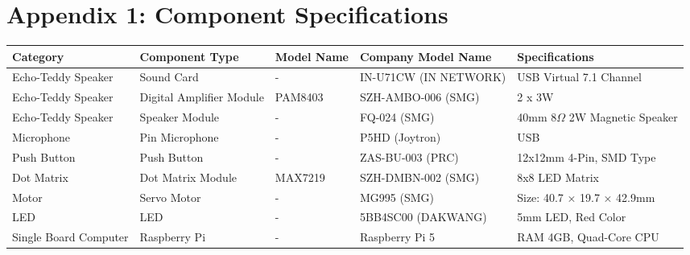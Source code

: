 
\newpage

\section{Appendix 1: Component Specifications}
\label{appendix}

\renewcommand{\arraystretch}{1.2}
\begin{table}[hbt!]
    \centering
    \scriptsize
    \renewcommand{\arraystretch}{1.2} %
    \setlength{\extrarowheight}{1pt}  %
    \begin{tabularx}{\textwidth}{XXXXX} %
        \hline
        \textbf{Category} & \textbf{Component Type} & \textbf{Model Name} & \textbf{Company Model Name} & \textbf{Specifications} \\
        \hline
        Echo-Teddy Speaker & Sound Card & - & IN-U71CW (IN NETWORK) & USB Virtual 7.1 Channel \\
        Echo-Teddy Speaker & Digital Amplifier Module & PAM8403 & SZH-AMBO-006 (SMG) & 2 x 3W \\
        Echo-Teddy Speaker & Speaker Module & - & FQ-024 (SMG) & 40mm 8$\Omega$ 2W Magnetic Speaker \\
        Microphone & Pin Microphone & - & P5HD (Joytron) & USB \\
        Push Button & Push Button & - & ZAS-BU-003 (PRC) & 12x12mm 4-Pin, SMD Type \\
        Dot Matrix & Dot Matrix Module & MAX7219 & SZH-DMBN-002 (SMG) & 8x8 LED Matrix \\
        Motor & Servo Motor & - & MG995 (SMG) & Size: 40.7 × 19.7 × 42.9mm \\
        LED & LED & - & 5BB4SC00 (DAKWANG) & 5mm LED, Red Color \\
        Single Board Computer & Raspberry Pi & - & Raspberry Pi 5 & RAM 4GB, Quad-Core CPU \\
        \hline
    \end{tabularx}
\end{table}
